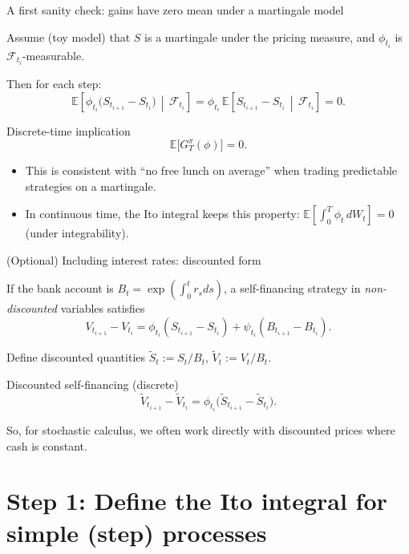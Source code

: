 \documentclass[10pt,aspectratio=169]{beamer}
\newcommand{\E}{\mathbb{E}}
\newcommand{\cF}{\mathcal{F}}
\begin{document}
\begin{frame}{A first sanity check: gains have zero mean under a martingale model}

Assume (toy model) that $S$ is a martingale under the pricing measure, and $\phi_{t_i}$ is $\cF_{t_i}$-measurable.\pause

Then for each step:
\[
\E\!\left[\phi_{t_i}\big(S_{t_{i+1}}-S_{t_i}\big)\,\middle|\,\cF_{t_i}\right]
=
\phi_{t_i}\,\E\!\left[S_{t_{i+1}}-S_{t_i}\,\middle|\,\cF_{t_i}\right]
=0.
\]
\pause

\begin{block}{Discrete-time implication}
\[
\E\big[G_T^{\pi}(\phi)\big]=0.
\]
\end{block}
\pause

\begin{itemize}
  \item This is consistent with “no free lunch on average” when trading predictable strategies on a martingale.\pause
  \item In continuous time, the Ito integral keeps this property:
  $\E\!\left[\int_0^T \phi_t\, dW_t\right]=0$ (under integrability).
\end{itemize}

\end{frame}

\begin{frame}{(Optional) Including interest rates: discounted form}

If the bank account is $B_t=\exp\!\left(\int_0^t r_s ds\right)$, a self-financing strategy in \emph{non-discounted} variables satisfies
\[
V_{t_{i+1}}-V_{t_i}
=
\phi_{t_i}(S_{t_{i+1}}-S_{t_i})
+\psi_{t_i}(B_{t_{i+1}}-B_{t_i}).
\]
\pause

Define discounted quantities $\widetilde S_t:=S_t/B_t$, $\widetilde V_t:=V_t/B_t$.\pause

\begin{block}{Discounted self-financing (discrete)}
\[
\widetilde V_{t_{i+1}}-\widetilde V_{t_i}
=
\phi_{t_i}\big(\widetilde S_{t_{i+1}}-\widetilde S_{t_i}\big).
\]
\end{block}

\medskip
So, for stochastic calculus, we often work directly with discounted prices where cash is constant.

\end{frame}

\section{Step 1: Define the Ito integral for simple (step) processes}
\end{document}
